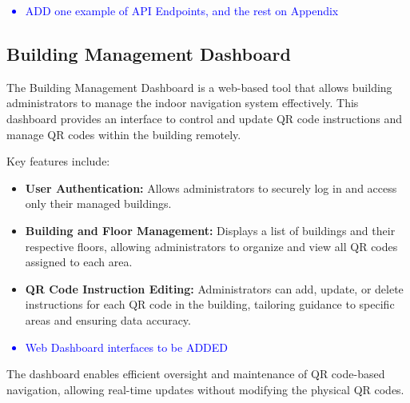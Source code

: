 \textcolor{blue}{
	\begin{itemize}
		\item ADD one example of API Endpoints, and the rest on Appendix 
\end{itemize}}


\subsection{Building Management Dashboard}

The Building Management Dashboard is a web-based tool that allows building administrators to manage the indoor navigation system effectively. This dashboard provides an interface to control and update QR code instructions and manage QR codes within the building remotely.

Key features include:
\begin{itemize}
	\item \textbf{User Authentication:} Allows administrators to securely log in and access only their managed buildings.
	\item \textbf{Building and Floor Management:} Displays a list of buildings and their respective floors, allowing administrators to organize and view all QR codes assigned to each area.
	\item \textbf{QR Code Instruction Editing:} Administrators can add, update, or delete instructions for each QR code in the building, tailoring guidance to specific areas and ensuring data accuracy.
\end{itemize}

\textcolor{blue}{
	\begin{itemize}
		\item Web Dashboard interfaces to be ADDED
\end{itemize}}

The dashboard enables efficient oversight and maintenance of QR code-based navigation, allowing real-time updates without modifying the physical QR codes.
